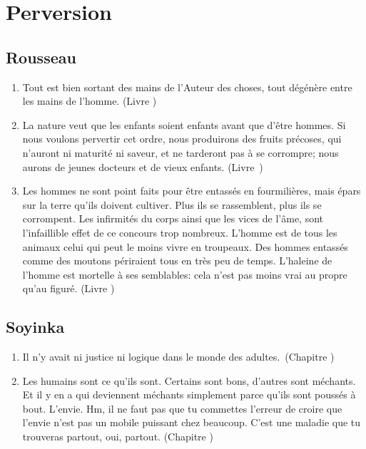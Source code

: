 \documentclass[a4paper, 11pt, hidelinks]{article}
\newcommand{\rb}[1]{\Romanbar{#1}}
\begin{document}
\section{Perversion}



\subsection{Rousseau}


\begin{enumerate}
    \item Tout est bien sortant des mains de l'Auteur des choses, tout dégénère entre les mains de l'homme. (Livre \rb{1})
    \item La nature veut que les enfants soient enfants avant que d'être hommes. Si nous voulons pervertir cet ordre, nous produirons des fruits précoses, qui n'auront ni maturité ni saveur, et ne tarderont pas à se corrompre; nous aurons de jeunes docteurs et de vieux enfants. (Livre \rb{2})
    \item Les hommes ne sont point faits pour être entassés en fourmilières, mais épars sur la terre qu'ils doivent cultiver. Plus ils se rassemblent, plus ils se corrompent. Les infirmités du corps ainsi que les vices de l'âme, sont l'infaillible effet de ce concours trop nombreux. L'homme est de tous les animaux celui qui peut le moins vivre en troupeaux. Des hommes entassés comme des moutons périraient tous en très peu de temps. L'haleine de l'homme est mortelle à ses semblables: cela n'est pas moins vrai au propre qu'au figuré. (Livre \rb{1})

\end{enumerate}



\subsection{Soyinka}


\begin{enumerate}
    \item Il n'y avait ni justice ni logique dans le monde des adultes. (Chapitre \rb{7})
    \item Les humains sont ce qu'ils sont. Certains sont bons, d'autres sont méchants. Et il y en a qui deviennent méchants simplement parce qu'ils sont poussés à bout. L'envie. Hm, il ne faut pas que tu commettes l'erreur de croire que l'envie n'est pas un mobile puissant chez beaucoup. C'est une maladie que tu trouveras partout, oui, partout. (Chapitre \rb{9})
\end{enumerate}
\end{document}

